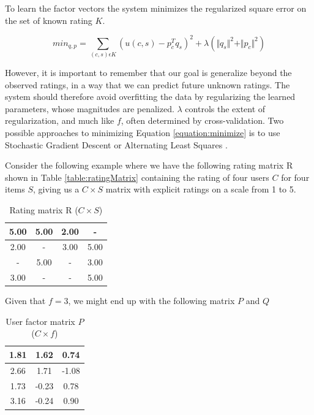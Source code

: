 To learn the factor vectors the system minimizes the regularized square error on the set of known rating $K$.

\begin{equation}
\label{equation:minimize}
min_{q, p} = \sum_{(c,s)\epsilon K} (u(c,s) - p^{T}_{c}q_{s})^{2} + \lambda ( \Vert q_{s} \Vert ^{2} + \Vert p_{c} \Vert ^{2})
\end{equation}

However, it is important to remember that our goal is generalize beyond the observed ratings, in a way that we can predict future unknown ratings. The system should therefore avoid overfitting the data by regularizing the learned parameters, whose magnitudes are penalized. $\lambda$ controls the extent of regularization, and much like $f$, often determined by cross-validation. Two possible approaches to minimizing Equation \ref{equation:minimize} is to use Stochastic Gradient Descent or Alternating Least Squares \citep{Koren2009}.

Consider the following example where we have the following rating matrix R shown in Table \ref{table:ratingMatrix} containing the rating of four users $C$ for four items $S$, giving us a $C \times S$ matrix with explicit ratings on a scale from 1 to 5.

\begin{table}[!htbp]
\centering
\begin{tabular}{|c|c|c|c|}
\hline
5.00    & 5.00  & 2.00 & -    \\ \hline
2.00    & -     & 3.00 & 5.00 \\ \hline
 -      & 5.00  & -    & 3.00 \\ \hline
3.00    & -     & -    & 5.00 \\ \hline
\end{tabular}
\label{table:RatingMatrix}
\caption{Rating matrix R ($C \times S$)}
\end{table}

Given that $f = 3$, we might end up with the following matrix $P$ and $Q$

\begin{table}[!htbp]
\centering
\begin{tabular}{|c|c|c|}
\hline
1.81    &1.62   &0.74\\ \hline
2.66    &1.71   &-1.08\\ \hline
1.73    &-0.23  &0.78\\ \hline
3.16    &-0.24  &0.90\\ \hline
\end{tabular}
\label{table:ItemFeature}
\caption{User factor matrix $P$ ($C \times f$)}
\end{table}

